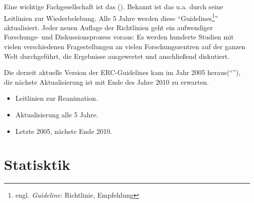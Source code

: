 {
Eine wichtige Fachgesellschaft ist das  (). Bekannt ist das  u.a. durch seine Leitlinien zur
Wiederbelebung. Alle 5 Jahre werden diese
"`Guidelines\footnote{{\flq}engl.{\frq} \emph{Guideline}: Richtlinie,
Empfehlung}"' aktualisiert. Jeder neuen Auflage der Richtlinien geht ein aufwendiger Forschungs- und Diskussionsprozess voraus: Es werden hunderte Studien mit vielen verschiedenen Fragestellungen an vielen
Forschungszentren auf der ganzen Welt durchgeführt, die Ergebnisse ausgewertet und anschließend diskutiert. 

Die derzeit aktuelle Version
der ERC-Guidelines kam im Jahr 2005 heraus("`"'), die nächste
Aktualisierung ist mit Ende des Jahre 2010 zu erwarten.
}{
\begin{itemize}
   \item Leitlinien zur Reanimation.
   \item Aktualisierung alle 5 Jahre.
   \item Letzte 2005, nächste Ende 2010.
\end{itemize}

}{}{}{}


\section{Statisktik}


